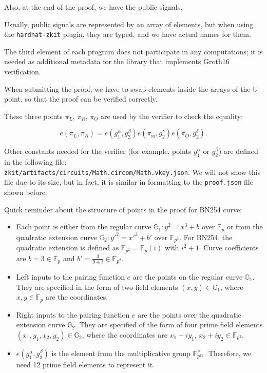 \documentclass[../lecture-notes-148x210.tex]{subfiles}
\begin{document}
Also, at the end of the proof, we have the public signals.

\begin{remark}
    Usually, public signals are represented by an array of elements, but when using the \texttt{hardhat-zkit} plugin,
    they are typed, and we have actual names for them.
\end{remark}

The third element of each program does not participate in any computations; it is needed as additional metadata for the library that implements Groth16 verification.

\begin{remark}
    When submitting the proof, we have to swap elements inside the arrays of the b point, so that the proof can be verified correctly.
\end{remark}

These three points $\pi_L$, $\pi_R$, $\pi_O$ are used by the verifier to check the equality:

\vspace{-0.5em}

\[
    e(\pi_L, \pi_R) = e(g_1^\alpha, g_2^\beta)e(\pi_{\text{io}},g_2^\gamma)e(\pi_O,g_2^\delta).
\]

\vspace{-0.5em}

Other constants needed for the verifier (for example, points $g_1^{\alpha}$ or $g_2^{\beta}$) are defined
in the following file: \\ \texttt{zkit/artifacts/circuits/Math.circom/Math.vkey.json}. 
We will not show this file due to its size, but in fact, it is similar in formatting to the \texttt{proof.json}
file shown before.

Quick reminder about the structure of points in the proof for BN254 curve:
\begin{itemize}
    \item Each point is either from the regular curve $\mathbb{G}_1: y^2=x^3+b$ over $\mathbb{F}_p$ or from the quadratic extension curve $\mathbb{G}_2: y'^2=x'^3+b'$ over $\mathbb{F}_{p^2}$. For BN254, the quadratic extension is defined as $\mathbb{F}_{p^2} = \mathbb{F}_p(i)$ with $i^2+1$. Curve coefficients are $b=3 \in \mathbb{F}_p$ and $b'=\frac{3}{9+i} \in \mathbb{F}_{p^2}$.
    \item Left inputs to the pairing function $e$ are the points on the regular curve $\mathbb{G}_1$. They are specified in the form of two field elements $(x,y) \in \mathbb{G}_1$, where $x, y \in \mathbb{F}_p$ are the coordinates.
    \item Right inputs to the pairing function $e$ are the points over the quadratic extension curve $\mathbb{G}_2$. They are specified of the form of four prime field elements $(x_{1}, y_{1}, x_{2}, y_2) \in \mathbb{G}_2$, where the coordinates are $x_1+iy_1$, $x_2+iy_2 \in \mathbb{F}_{p^2}$.
    \item $e(g_1^{\alpha}, g_2^{\beta})$ is the element from the multiplicative group $\mathbb{F}_{p^{12}}^{\times}$. Therefore, we need 12 prime field elements to represent it.
\end{itemize}
\end{document}
